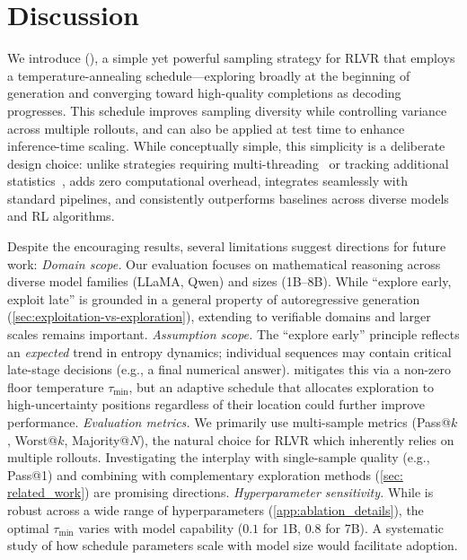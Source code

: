\section{Discussion}
We introduce \algname (\alg), a simple yet powerful sampling strategy for RLVR that employs a temperature-annealing schedule---exploring broadly at the beginning of generation and converging toward high-quality completions as decoding progresses. This schedule improves sampling diversity while controlling variance across multiple rollouts, and can also be applied at test time to enhance inference-time scaling. While conceptually simple, this simplicity is a deliberate design choice: unlike strategies requiring multi-threading~\citep{pan2025learning} or tracking additional statistics~\citep{cui2025entropy}, \alg adds zero computational overhead, integrates seamlessly with standard pipelines, and consistently outperforms baselines across diverse models and RL algorithms.

Despite the encouraging results, several limitations suggest directions for future work:
\textit{Domain scope.} Our evaluation focuses on mathematical reasoning across diverse model families (LLaMA, Qwen) and sizes (1B--8B). While ``explore early, exploit late'' is grounded in a general property of autoregressive generation (\cref{sec:exploitation-vs-exploration}), extending \alg to  verifiable domains and larger scales remains important.
%
\textit{Assumption scope.} The ``explore early'' principle reflects an \emph{expected} trend in entropy dynamics; individual sequences may contain critical late-stage decisions (e.g., a final numerical answer). \alg mitigates this via a non-zero floor temperature $\tau_{\min}$, but an adaptive schedule that allocates exploration to high-uncertainty positions regardless of their location could further improve performance.
%
\textit{Evaluation metrics.} We primarily use multi-sample metrics (Pass@$k$, Worst@$k$, Majority@$N$), the natural choice for RLVR which inherently relies on multiple rollouts. Investigating the interplay with single-sample quality (e.g., Pass@1) and combining \alg with complementary exploration methods (\cref{sec: related_work}) are promising directions.
%
\textit{Hyperparameter sensitivity.} While \alg is robust across a wide range of hyperparameters (\cref{app:ablation_details}), the optimal $\tau_{\min}$ varies with model capability ($0.1$ for 1B, $0.8$ for 7B). A systematic study of how schedule parameters scale with model size would facilitate adoption.

